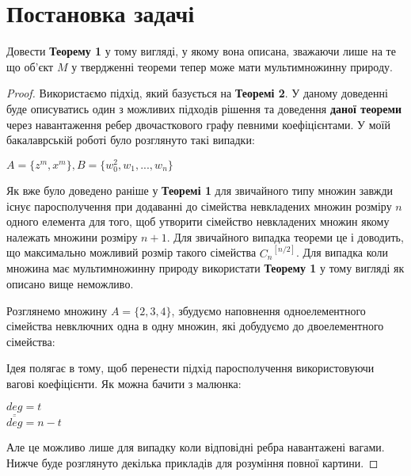 \section{Постановка задачі}

\begin{theorem}
Довести {\bf Теорему 1} у тому вигляді, у якому вона описана, зважаючи лише на те що об'єкт $M$ у твердженні теореми тепер може мати мультимножинну природу.
\end{theorem}

\begin{proof}
Використаємо підхід, який базується на {\bf Теоремі 2}. У даному доведенні буде описуватись один з можливих підходів рішення та доведення {\bf даної теореми} через навантаження ребер двочасткового графу певними коефіцієнтами.
У моїй бакалаврській роботі було розглянуто такі випадки: 
\begin{center}
$A = \{z^m,x^m\}, B = \{w_0^{2}, w_1,...,w_n\}$
\end{center}

Як вже було доведено раніше у {\bf Теоремі 1} для звичайного типу множин завжди існує паросполучення при додаванні до сімейства невкладених множин розміру $n$ одного елемента для того, щоб утворити сімейство невкладених множин якому належать множини розміру $n+1$. Для звичайного випадка теореми це і доводить, що максимально можливий розмір такого сімейства ${C_n}^{[n/2]}$. Для випадка коли множина має мультимножинну природу використати {\bf Теорему 1} у тому вигляді як описано вище неможливо.

\begin{example}

Розглянемо множину $ A = \{2,3,4\} $, збудуємо наповнення одноелементного сімейства невключних одна в одну множин, які добудуємо до двоелементного сімейства:

\begin{center}
\end{center}
\end{example}

Ідея полягає в тому, щоб перенести підхід паросполучення використовуючи вагові коефіцієнти.
Як можна бачити з малюнка:
\begin{center}
$ \underline{deg} = t $
\\
$ \overline{deg} = n - t $
\end{center}
Але це можливо лише для випадку коли відповідні ребра навантажені вагами. Нижче буде розглянуто декілька прикладів для розуміння повної картини.
\end{proof}


